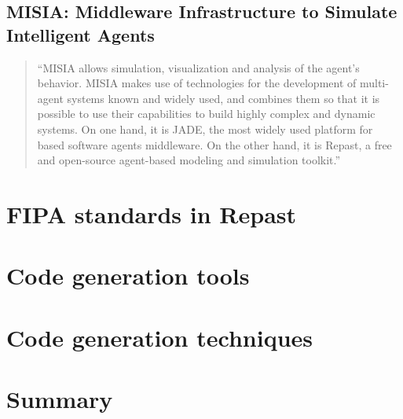 \subsection{
	MISIA: Middleware Infrastructure to Simulate Intelligent Agents}
\begin{quote}
	``MISIA allows simulation, visualization and analysis of the agent’s behavior. MISIA makes use of technologies for the development of multi-agent systems known and widely used, and combines them so that it is possible to use their capabilities to build highly complex and dynamic systems. On one hand, it is JADE, the most widely used platform for based software agents middleware. On the other hand, it is Repast, a free and open-source agent-based modeling and simulation toolkit.'' \cite{gormer2011jrep}
\end{quote}


\section{FIPA standards in Repast}


\section{Code generation tools}


\section{Code generation techniques}




\section{Summary}


